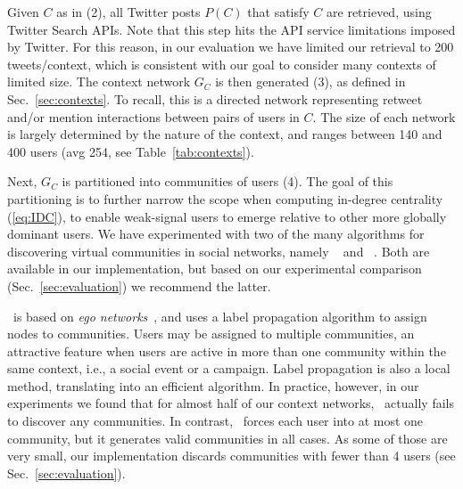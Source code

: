 %
Given $C$ as in (2), all Twitter posts $P(C)$ that satisfy $C$ are retrieved, using Twitter Search APIs.
Note that this step hits the API service limitations imposed by Twitter. 
For this reason, in our evaluation we have limited our retrieval to 200 tweets/context, which is consistent with our goal to consider many contexts of limited size.
%
The context network $G_C$ is then generated (3), as defined in Sec.~\ref{sec:contexts}. To recall, this is a directed network representing retweet and/or mention interactions between pairs of users in $C$. 
The size of each network is largely determined by the nature of the context, and  ranges between 140 and 400 users (avg 254, see Table~\ref{tab:contexts}).


Next, $G_C$  is partitioned into communities of users (4).
The goal of this partitioning is to further narrow the scope when computing in-degree centrality (\ref{eq:IDC}), 
to enable weak-signal users to emerge relative to other more globally dominant users.
%
We have experimented with two of the many algorithms for discovering virtual communities in social networks, namely \demon~\cite{Coscia:2012:DLD:2339530.2339630} and  \infomap~\cite{INFOMAP}. 
Both are available in our implementation, but based on our experimental comparison (Sec.~\ref{sec:evaluation}) we recommend the latter.

\demon~is based on \textit{ego networks}~\cite{Arnaboldi2013}, and uses a label propagation algorithm to assign nodes to communities.  
Users may be assigned to multiple communities, an attractive feature when users are active in more than one community within the same context, i.e., a social event or a campaign.
Label propagation is also a local method, translating into an efficient algorithm.
In practice, however, in our experiments we found that for almost half of our context networks, \demon~actually fails to discover any communities.
%
In contrast, \infomap~forces each user into at most one community, but it generates valid communities in all cases. 
As some of those are very small, our  implementation discards communities with fewer than 4 users (see Sec.~\ref{sec:evaluation}).
%


